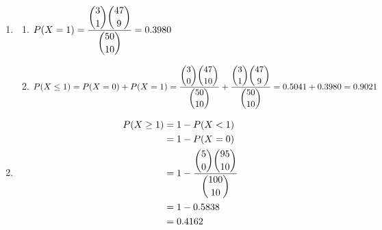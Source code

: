 \documentclass{article}
\begin{document}
\begin{enumerate}
      
     \item 
      \begin{enumerate}
       \item 
	  $P(X = 1) = \dfrac{\dbinom{3}{1}\dbinom{47}{9}}{\dbinom{50}{10}} = 0.3980$
	  
       \item
	  $P(X \le 1) = P(X = 0) + P(X = 1) = 
	    \dfrac{\dbinom{3}{0}\dbinom{47}{10}}{\dbinom{50}{10}} +
	    \dfrac{\dbinom{3}{1}\dbinom{47}{9}}{\dbinom{50}{10}} = 0.5041 + 0.3980 = 0.9021$
      \end{enumerate}

     \item
	\begin{align*}
	  P(X \ge 1) &= 1 - P(X < 1) \\
		     &= 1 - P(X = 0) \\
		     &= 1 - \dfrac{\dbinom{5}{0}\dbinom{95}{10}}{\dbinom{100}{10}} \\
		     &= 1 - 0.5838 \\
		     &= 0.4162
	\end{align*}
    \end{enumerate}
    
\end{document}
